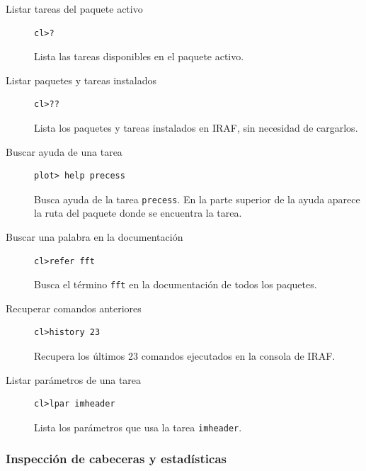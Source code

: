 \begin{description}

\item[Listar tareas del paquete activo]
\begin{verbatim}
cl>?
\end{verbatim}
Lista las tareas disponibles en el paquete activo.

\item[Listar paquetes y tareas instalados]
\begin{verbatim}
cl>??
\end{verbatim}
Lista los paquetes y tareas instalados en IRAF, sin necesidad de cargarlos.

\item[Buscar ayuda de una tarea]
\begin{verbatim}
plot> help precess
\end{verbatim}
Busca ayuda de la tarea \texttt{precess}. En la parte superior de la ayuda aparece la ruta del paquete donde se encuentra la tarea.

\item[Buscar una palabra en la documentación]
\begin{verbatim}
cl>refer fft
\end{verbatim}
Busca el término \texttt{fft} en la documentación de todos los paquetes.

\item[Recuperar comandos anteriores]
\begin{verbatim}
cl>history 23
\end{verbatim}
Recupera los últimos 23 comandos ejecutados en la consola de IRAF.

\item[Listar parámetros de una tarea]
\begin{verbatim}
cl>lpar imheader
\end{verbatim}
Lista los parámetros que usa la tarea \texttt{imheader}.

\end{description}

\subsubsection*{Inspección de cabeceras y estadísticas}

